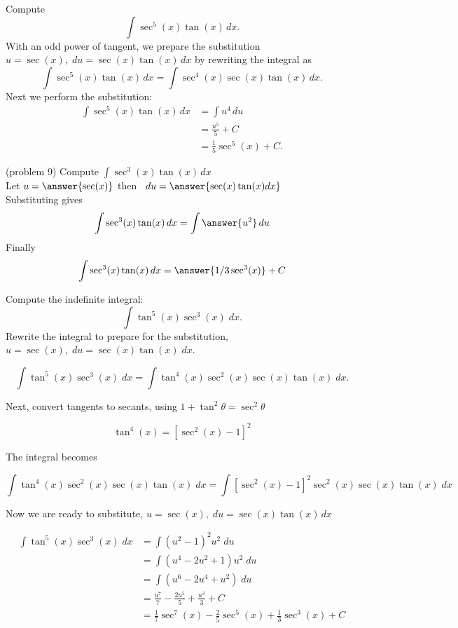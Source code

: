 \documentclass[handout]{ximera}
\begin{document}
\begin{example}[example 9]

Compute
\[
\int \sec^5(x) \tan(x) \, dx.
\]
With an odd power of tangent, we prepare the substitution $u = \sec(x), \; du = \sec(x)\tan(x) \, dx$ by rewriting the integral as
\[
\int \sec^5(x) \tan(x) \, dx = \int \sec^4(x) \sec(x) \tan(x) \, dx.
\]
Next we perform the substitution:
\begin{align*}
\int \sec^5(x) \tan(x) \, dx &= \int u^4 \, du\\
                             &= \frac{u^5}{5} + C\\
                             &= \frac15 \sec^5(x) + C.
\end{align*}

\end{example}


\begin{problem}(problem 9)
Compute $\displaystyle{\int \sec^3(x) \tan(x) \, dx}$\\
Let $u = \answer{\sec(x)}$ then \, $du = \answer{\sec(x)\tan(x) dx}$\\
Substituting gives 
\[
\int \sec^3(x) \tan(x) \, dx = \int \answer{u^2} \, du
\]
Finally
\[
\int \sec^3(x) \tan(x) \, dx = \answer{1/3 \sec^3(x)} + C
\]

\end{problem}


\begin{example}[example 10]
Compute the indefinite integral:
\[
\int \tan^5(x) \sec^3(x)\;dx.
\]
Rewrite the integral to prepare for the substitution, $u = \sec(x), \;du = \sec(x) \tan(x) \; dx$.

\[
\int \tan^5(x) \sec^3(x)\;dx = \int \tan^4(x) \sec^2(x) \sec(x) \tan(x)\;dx.
\]

Next, convert tangents to secants, using $1+ \tan^2 \theta = \sec^2 \theta$

\[
\tan^4(x) = \left[\sec^2(x) - 1\right]^2
\]

The integral becomes

\[
 \int \tan^4(x) \sec^2(x) \sec(x) \tan(x)\;dx = \int \left[\sec^2(x) -1\right]^2 \sec^2(x) \sec(x) \tan(x)\;dx
\]

Now we are ready to substitute, $u = \sec(x), \; du = \sec(x) \tan(x) \, dx$

\begin{align*}
\int \tan^5(x) \sec^3(x)\;dx &= \int \left(u^2 -1\right)^2 u^2 \; du \\
                             &= \int \left(u^4 - 2u^2 +1\right) u^2 \; du \\
                             &= \int \left(u^6 - 2u^4 +u^2\right) \; du \\
                             &=  \frac{u^7}{7} - \frac{2u^5}{5} + \frac{u^3}{3} + C  \\
                             &= \frac17\sec^7(x) - \frac25 \sec^5(x) + \frac13 \sec^3(x) + C
\end{align*}
\end{example}
\end{document}
